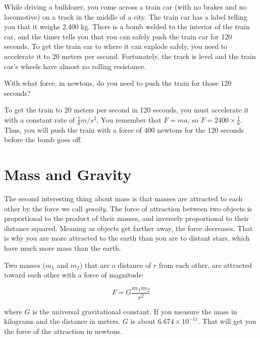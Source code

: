 \begin{Exercise}[title={Acceleration}, label=acceleration_train]

While driving a bulldozer, you come across a train car (with no brakes
and no locomotive) on a track in the middle of a city. The train car
has a label telling you that it weighs 2,400 kg. There is a bomb
welded to the interior of the train car, and the timer tells you that
you can safely push the train car for 120 seconds. To get the train
car to where it can explode safely, you need to accelerate it to 20 meters per
second. Fortunately, the track is level and the train car's wheels have
almost no rolling resistance.

With what force, in newtons, do you need to push the train for those 120 seconds?

\end{Exercise}
\begin{Answer}[ref=acceleration_train]
To get the train to 20 meters per second in 120 seconds, you must
accelerate it with a constant rate of $\frac{1}{6} m/s^2$. You
remember that $F = m a$, so $F = 2400 \times \frac{1}{6}$. Thus, you
will push the train with a force of 400 newtons for the 120 seconds
before the bomb goes off.
\end{Answer}

\section{Mass and Gravity}

The second interesting thing about mass is that masses are
attracted to each other by the force we call \textit{gravity}. The
force of attraction between two objects is proportional to the product
of their masses, and inversely proportional to their distance squared.
Meaning as objects get farther away, the force decreases.
That is why you are more attracted to the earth than you are to
distant stars, which have much more mass than the earth.

\begin{mdframed}[style=important, frametitle={Newton's Law of Universal Gravitation}]

Two masses ($m_1$ and $m_2$) that are a distance of
$r$ from each other, are attracted toward each other with a force of
magnitude:

$$F = G\frac{m_1 m_2}{r^2}$$

where $G$ is the universal gravitational constant. If you measure the
mass in kilograms and the distance in meters. $G$ is about $6.674
\times 10^{-11}$.  That will get you the force of the attraction in
newtons.

\end{mdframed}

